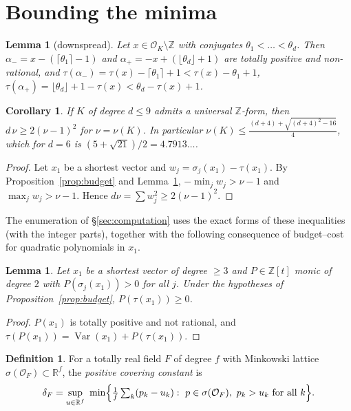 \documentclass[11pt]{amsart}
\newtheorem{lemma}[theorem]{Lemma}
\newtheorem{corollary}[theorem]{Corollary}
\theoremstyle{definition}
\newtheorem{definition}[theorem]{Definition}
\DeclareMathOperator{\Var}{Var}
\newcommand{\OK}{\mathcal{O}_K}
\newcommand{\OF}{\mathcal{O}_F}
\newcommand{\Z}{\mathbb{Z}}
\newcommand{\R}{\mathbb{R}}
\begin{document}
\section{Bounding the minima}\label{sec:bounds}

\begin{lemma}[downspread]\label{lem:downspread}
Let $x\in\OK\setminus\Z$ with conjugates $\theta_1<\dots<\theta_d$.  Then
$\alpha_-=x-(\lceil\theta_1\rceil-1)$ and $\alpha_+=-x+(\lfloor\theta_d\rfloor+1)$ are totally
positive and non-rational, and
$\tau(\alpha_-)=\tau(x)-\lceil\theta_1\rceil+1<\tau(x)-\theta_1+1$,
$\tau(\alpha_+)=\lfloor\theta_d\rfloor+1-\tau(x)<\theta_d-\tau(x)+1$.
\end{lemma}

\begin{corollary}\label{cor:nubound}
If $K$ of degree $d\le9$ admits a universal $\Z$-form, then $d\,\nu\ge2(\nu-1)^2$ for
$\nu=\nu(K)$.  In particular $\nu(K)\le\frac{(d+4)+\sqrt{(d+4)^2-16}}{4}$, which for $d=6$
is $(5+\sqrt{21})/2=4.7913\ldots$.
\end{corollary}

\begin{proof}
Let $x_1$ be a shortest vector and $w_j=\sigma_j(x_1)-\tau(x_1)$.  By
Proposition~\ref{prop:budget} and Lemma~\ref{lem:downspread}, $-\min_jw_j>\nu-1$ and
$\max_jw_j>\nu-1$.  Hence $d\nu=\sum w_j^2\ge2(\nu-1)^2$.
\end{proof}

The enumeration of \S\ref{sec:computation} uses the exact forms of these inequalities (with
the integer parts), together with the following consequence of budget--cost for quadratic
polynomials in $x_1$.

\begin{lemma}\label{lem:quadfilter}
Let $x_1$ be a shortest vector of degree $\ge3$ and $P\in\Z[t]$ monic of degree $2$ with
$P(\sigma_j(x_1))>0$ for all $j$.  Under the hypotheses of Proposition~\ref{prop:budget},
$P(\tau(x_1))\ge0$.
\end{lemma}

\begin{proof}
$P(x_1)$ is totally positive and not rational, and $\tau(P(x_1))=\Var(x_1)+P(\tau(x_1))$.
\end{proof}

\begin{definition}
For a totally real field $F$ of degree $f$ with Minkowski lattice $\sigma(\OF)\subset\R^f$,
the \emph{positive covering constant} is
\[
\delta_F=\sup_{u\in\R^f}\ \min\Bigl\{\tfrac1f\textstyle\sum_k(p_k-u_k):\ p\in\sigma(\OF),\
p_k>u_k\ \text{for all }k\Bigr\}.
\]
\end{definition}
\end{document}
